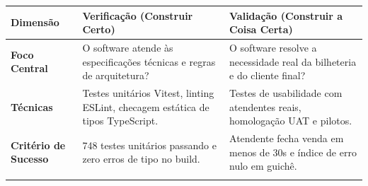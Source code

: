 \begin{center}
\small
\begin{tabularx}{\textwidth}{>{\fontSemiBold\color{BrandNavy}\arraybackslash}m{3.2cm} Y Y}
\toprule
{}
\textbf{Dimensão} & \textbf{Verificação (Construir Certo)} & \textbf{Validação (Construir a Coisa Certa)} \\
\midrule
{}
\textbf{Foco Central} & O software atende às especificações técnicas e regras de arquitetura? & O software resolve a necessidade real da bilheteria e do cliente final? \\
\midrule
\textbf{Técnicas} & Testes unitários Vitest, linting ESLint, checagem estática de tipos TypeScript. & Testes de usabilidade com atendentes reais, homologação UAT e pilotos. \\
\midrule
\textbf{Critério de Sucesso} & 748 testes unitários passando e zero erros de tipo no build. & Atendente fecha venda em menos de 30s e índice de erro nulo em guichê. \\
\bottomrule
\end{tabularx}
\end{center}
